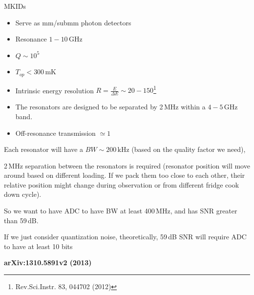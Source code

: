 \documentclass[ignorenonframetext,12pt]{beamer}
\begin{document}
\begin{frame}{MKIDs}
				\scriptsize{\begin{itemize}
								\item Serve as mm/submm photon detectors
								\item Resonance  $1-10\,\text{GHz}$ 
								\item $Q \sim 10^5$
								\item $T_{op} < 300\,\text{mK}$
								\item Intrinsic energy resolution $R = \frac{E}{\Delta E} \sim
												20-150$\footnote{Rev.Sci.Instr. 83, 044702 (2012)}
								\item The resonators are designed to be separated by 2\,MHz
												within a $4-5\,\text{GHz}$ band.
								\item Off-resonance transmission $\simeq 1$
				\end{itemize}
				Each resonator will have a $BW \sim 200\,\text{kHz}$ (\alert{based on the
				quality factor we need}),

				2\,MHz separation between the resonators is required (resonator position
				will move around based on different loading. If we pack them too close
				to each other, their relative position might change during observation
				or from different fridge cook down cycle). 

				So we want to have ADC to have BW at least 400\,MHz, and has SNR greater
				than 59\,dB. 

				If we just consider quantization noise, theoretically, 59\,dB SNR will
				require ADC to have at least 10 bits
				}

				\tiny{\textbf{arXiv:1310.5891v2 (2013)}}
\end{frame}
\end{document}
